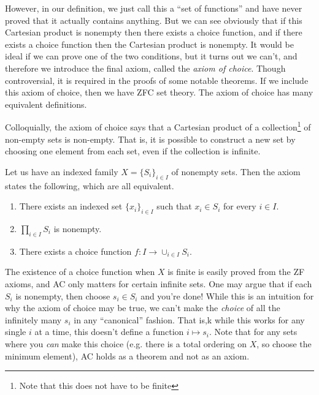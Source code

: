   However, in our definition, we just call this a ``set of functions'' and have never proved that it actually contains anything. But we can see obviously that if this Cartesian product is nonempty then there exists a choice function, and if there exists a choice function then the Cartesian product is nonempty. It would be ideal if we can prove one of the two conditions, but it turns out we can't, and therefore we introduce the final axiom, called the \textit{axiom of choice}. Though controversial, it is required in the proofs of some notable theorems. If we include this axiom of choice, then we have ZFC set theory. The axiom of choice has many equivalent definitions. 

  Colloquially, the axiom of choice says that a Cartesian product of a collection\footnote{Note that this does not have to be finite} of non-empty sets is non-empty. That is, it is possible to construct a new set by choosing one element from each set, even if the collection is infinite. 

  \begin{axiom}
    Let us have an indexed family $X = \{S_i\}_{i \in I}$ of nonempty sets. Then the axiom states the following, which are all equivalent. 
    \begin{enumerate}
      \item There exists an indexed set $\{x_i\}_{i \in I}$ such that $x_i \in S_i$ for every $i \in I$. 
      \item $\prod_{i \in I} S_i$ is nonempty. 
      \item There exists a choice function $f: I \rightarrow \cup_{i \in I} S_i$. 
    \end{enumerate}
  \end{axiom}

  The existence of a choice function when $X$ is finite is easily proved from the ZF axioms, and AC only matters for certain infinite sets. One may argue that if each $S_i$ is nonempty, then choose $s_i \in S_i$ and you're done! While this is an intuition for why the axiom of choice may be true, we can't make the \textit{choice} of all the infinitely many $s_i$ in any ``canonical'' fashion. That is,k while this works for any single $i$ at a time, this doesn't define a function $i \mapsto s_i$. Note that for any sets where you \textit{can} make this choice (e.g. there is a total ordering on $X$, so choose the minimum element), AC holds as a theorem and not as an axiom. 

